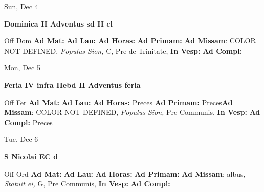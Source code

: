 \documentclass[10pt]{memoir}
\begin{document}
\begin{center}
\begin{minipage}{3.5in}
\vspace{2em}
\begin{center}Sun, Dec 4
\end{center}
\textbf{ \large Dominica II Adventus
\textnormal{\normalsize sd II cl}}

\begin{justify}Off Dom
\textbf{Ad Mat: }
\textbf{Ad Lau: }
\textbf{Ad Horas: }
\textbf{Ad Primam: }\textbf{Ad Missam}: COLOR NOT DEFINED, \textit{Populus Sion,} C, Pre de Trinitate, 
\textbf{In Vesp: }
\textbf{Ad Compl: }
\end{justify}
\end{minipage}
\end{center}

\begin{center}
\begin{minipage}{3.5in}
\vspace{2em}
\begin{center}Mon, Dec 5
\end{center}
\textbf{ \large Feria IV infra Hebd II Adventus
\textnormal{\normalsize feria}}

\begin{justify}Off Fer
\textbf{Ad Mat: }
\textbf{Ad Lau: }
\textbf{Ad Horas: }Preces
\textbf{Ad Primam: }Preces\textbf{Ad Missam}: COLOR NOT DEFINED, \textit{Populus Sion,} Pre Communis, 
\textbf{In Vesp: }
\textbf{Ad Compl: }Preces
\end{justify}
\end{minipage}
\end{center}

\begin{center}
\begin{minipage}{3.5in}
\vspace{2em}
\begin{center}Tue, Dec 6
\end{center}
\textbf{ \large S Nicolai EC
\textnormal{\normalsize d}}

\begin{justify}Off Ord
\textbf{Ad Mat: }
\textbf{Ad Lau: }
\textbf{Ad Horas: }
\textbf{Ad Primam: }\textbf{Ad Missam}: albus, \textit{Statuit ei,} G, Pre Communis, 
\textbf{In Vesp: }
\textbf{Ad Compl: }
\end{justify}
\end{minipage}
\end{center}
\end{document}

